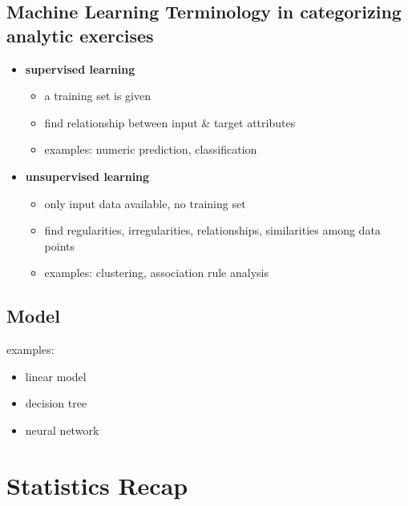 \subsection{Machine Learning Terminology in categorizing analytic exercises}
\begin{itemize}
	\item \textbf{supervised learning}
	\begin{itemize}
		\item a training set is given
		\item find relationship between input \& target attributes		
		\item examples: numeric prediction, classification
	\end{itemize}

	\item \textbf{unsupervised learning}
	\begin{itemize}
		\item only input data available, no training set
		\item find regularities, irregularities, relationships, similarities among data points
		\item examples: clustering, association rule analysis
	\end{itemize}
\end{itemize}

\subsection{Model}
examples: 
\begin{itemize}
	\item linear model
	\item decision tree
	\item neural network
\end{itemize}

\section{Statistics Recap}
